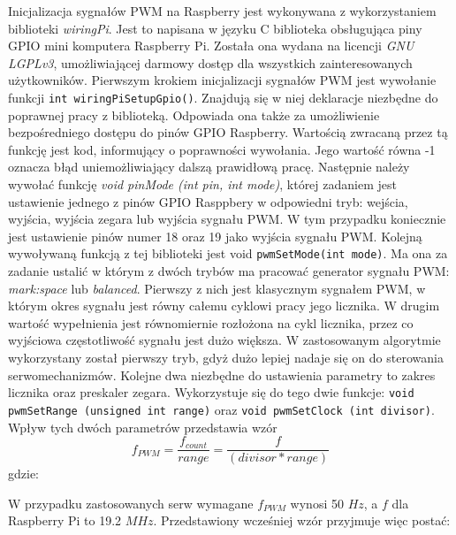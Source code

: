 Inicjalizacja sygnałów PWM na Raspberry jest wykonywana z wykorzystaniem biblioteki \textit{wiringPi}. Jest to napisana w języku C biblioteka obsługująca piny GPIO mini komputera Raspberry Pi. Została ona wydana na licencji \textit{GNU LGPLv3}, umożliwiającej darmowy dostęp dla wszystkich zainteresowanych użytkowników. Pierwszym krokiem inicjalizacji sygnałów PWM jest wywołanie funkcji \texttt{int wiringPiSetupGpio()}. Znajdują się w niej deklaracje niezbędne do poprawnej pracy z biblioteką. Odpowiada ona także za umożliwienie bezpośredniego dostępu do pinów GPIO Raspberry. Wartością zwracaną przez tą funkcję jest kod, informujący o poprawności wywołania. Jego wartość równa -1 oznacza błąd uniemożliwiający dalszą prawidłową pracę. Następnie należy wywołać funkcję \textit{void pinMode (int pin, int mode)}, której zadaniem jest ustawienie jednego z pinów GPIO Rasppbery w odpowiedni tryb: wejścia, wyjścia, wyjścia zegara lub wyjścia sygnału PWM. W tym przypadku koniecznie jest ustawienie pinów numer 18 oraz 19 jako wyjścia sygnału PWM. Kolejną wywoływaną funkcją z tej biblioteki jest void \texttt{pwmSetMode(int mode)}. Ma ona za zadanie ustalić w którym z dwóch trybów ma pracować generator sygnału PWM: \textit{mark:space} lub \textit{balanced}. Pierwszy z nich jest klasycznym sygnałem PWM, w którym okres sygnału jest równy całemu cyklowi pracy jego licznika. W drugim wartość wypełnienia jest równomiernie rozłożona na cykl licznika, przez co wyjściowa częstotliwość sygnału jest dużo większa. W zastosowanym algorytmie wykorzystany został pierwszy tryb, gdyż dużo lepiej nadaje się on do sterowania serwomechanizmów. Kolejne dwa niezbędne do ustawienia parametry to zakres licznika oraz preskaler zegara. Wykorzystuje się do tego dwie funkcje: \texttt{void pwmSetRange (unsigned int range)} oraz \texttt{void pwmSetClock (int divisor)}. Wpływ tych dwóch parametrów przedstawia wzór
\begin{equation}
f_{PWM} = \frac{f_{count}}{range} = \frac{f}{(divisor * range)}
\label{eq:hard_pwm}
\end{equation}
gdzie:
\begin{equationDescriptor}
\end{equationDescriptor}
W przypadku zastosowanych serw wymagane $f_{PWM}$ wynosi 50 $Hz$, a $f$ dla Raspberry Pi to 19.2 $MHz$. Przedstawiony wcześniej wzór przyjmuje więc postać:
